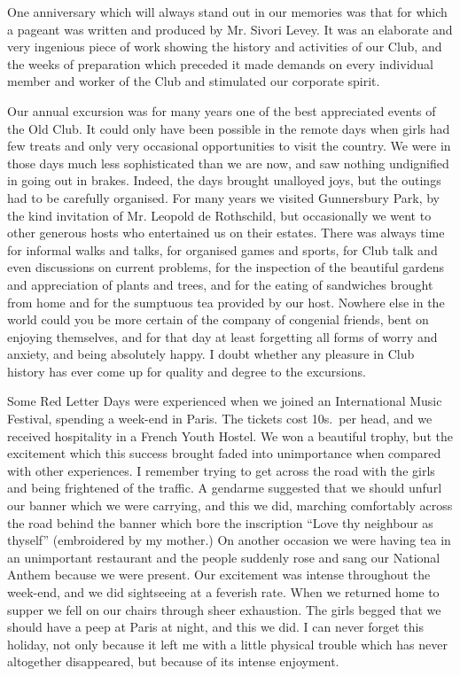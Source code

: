 One anniversary which will always stand out in our
memories was that for which a pageant was written and
produced by Mr. Sivori Levey. It was an elaborate and
very ingenious piece of work showing the history and
activities of our Club, and the weeks of preparation which
preceded it made demands on every individual member
and worker of the Club and stimulated our corporate
spirit.

Our annual excursion was for many years one of the
best appreciated events of the Old Club. It could only
have been possible in the remote days when girls had few
treats and only very occasional opportunities to visit the
country. We were in those days much less sophisticated
than we are now, and saw nothing undignified in going
out in brakes. Indeed, the days brought unalloyed joys,
but the outings had to be carefully organised. For many
years we visited Gunnersbury Park, by the kind invitation
of Mr. Leopold de Rothschild, but occasionally we went
to other generous hosts who entertained us on their estates.
There was always time for informal walks and talks, for
organised games and sports, for Club talk and even discussions
on current problems, for the inspection of the
beautiful gardens and appreciation of plants and trees,
and for the eating of sandwiches brought from home and
for the sumptuous tea provided by our host. Nowhere
else in the world could you be more certain of the company
of congenial friends, bent on enjoying themselves,
and for that day at least forgetting all forms of worry and
anxiety, and being absolutely happy. I doubt whether
any pleasure in Club history has ever come up for quality
and degree to the excursions.

Some Red Letter Days were experienced when we
joined an International Music Festival, spending a week-end
in Paris. The tickets cost 10s.\ per head, and we
received hospitality in a French Youth Hostel. We won
a beautiful trophy, but the excitement which this success
brought faded into unimportance when compared with
other experiences. I remember trying to get across the
road with the girls and being frightened of the traffic. A
gendarme suggested that we should unfurl our banner
which we were carrying, and this we did, marching comfortably
across the road behind the banner which bore
the inscription “Love thy neighbour as thyself” (embroidered
by my mother.) On another occasion we were
having tea in an unimportant restaurant and the people
suddenly rose and sang our National Anthem because we
were present. Our excitement was intense throughout the
week-end, and we did sightseeing at a feverish rate.
When we returned home to supper we fell on our chairs
through sheer exhaustion. The girls begged that we
should have a peep at Paris at night, and this we did. I
can never forget this holiday, not only because it left me
with a little physical trouble which has never altogether
disappeared, but because of its intense enjoyment.

